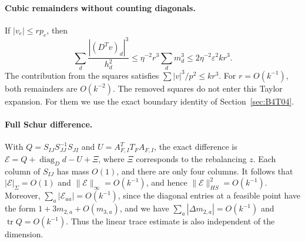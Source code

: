 \paragraph{Cubic remainders without counting diagonals.}
If $|v_e|\le rp_e$, then
\[
 \sum_d\frac{|(D^Tv)_d|^3}{h_d^2}
 \le\eta^{-2}r^3\sum_d m_d^3
 \le2\eta^{-2}\varepsilon^2kr^3.
\]
The contribution from the squares satisfies $\sum|v|^3/p^2\le kr^3$.
For $r=O(k^{-1})$, both remainders are $O(k^{-2})$.
The removed squares do not enter this Taylor expansion. For them we use the exact
boundary identity of Section~\ref{sec:B4T04}.

\paragraph{Full Schur difference.}
With $Q=S_{IJ}S_{JJ}^{-1}S_{JI}$ and $U=A_{F,I}^TT_FA_{F,I}$,
the exact difference is $\mathcal E=Q+\operatorname{diag}_D d-U+\Xi$,
where $\Xi$ corresponds to the rebalancing $z$.
Each column of $S_{IJ}$ has mass $O(1)$, and there are only four columns.
It follows that $|\mathcal E|_\Sigma=O(1)$ and $\|\mathcal E\|_\infty=O(k^{-1})$,
and hence $\|\mathcal E\|_{HS}^2=O(k^{-1})$.
Moreover, $\sum_a|\mathcal E_{aa}|=O(k^{-1})$, since
the diagonal entries at a feasible point have the form $1+3m_{2,a}+O(m_{3,a})$,
and we have $\sum_a|\Delta m_{2,a}|=O(k^{-1})$ and $\operatorname{tr}Q=O(k^{-1})$.
Thus the linear trace estimate is also independent of the dimension.
